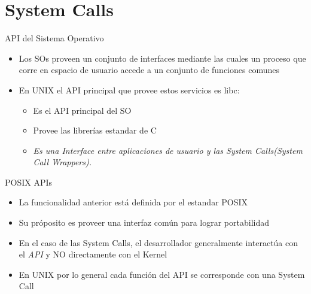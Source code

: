 \section{System Calls}


\begin{frame}{API del Sistema Operativo}
  \begin{itemize}
  \item Los SOs proveen un conjunto de interfaces mediante las cuales un proceso que corre en espacio de usuario accede a un conjunto de funciones comunes
   \begin{center}
   \end{center}

  \item En UNIX el API principal que provee estos servicios es libc:
  \begin{itemize}
    \item Es el \alert{API} principal del SO
    \item Provee las librerías estandar de C
    \item \textit{Es una Interface entre aplicaciones de usuario y las \alert{System Calls}(System Call Wrappers).} 
      \end{itemize} 
  \end{itemize}
\end{frame}

\begin{frame}{POSIX APIs}
  \begin{itemize}
  \item La funcionalidad anterior está definida por el estandar POSIX
  \item Su próposito es proveer una interfaz común para lograr portabilidad
  \item En el caso de las System Calls, el desarrollador generalmente interactúa con el \textit{API} y NO directamente con el Kernel   
  \item En UNIX por lo general cada función del \alert{API} se corresponde con una \alert{System Call}
  \end{itemize}
 \begin{center}
   \end{center}
\end{frame}

